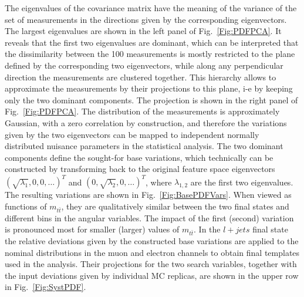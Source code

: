 The eigenvalues of the covariance matrix have the meaning of the variance of the set of measurements in the directions given by the corresponding eigenvectors.
The largest eigenvalues are shown in the left panel of Fig.~\ref{Fig:PDFPCA}.
It reveals that the first two eigenvalues are dominant, which can be interpreted that the dissimilarity between the 100 measurements is mostly restricted to the plane defined by the corresponding two eigenvectors, while along any perpendicular direction the measurements are clustered together.
This hierarchy allows to approximate the measurements by their projections to this plane, i-e by keeping only the two dominant components.
The projection is shown in the right panel of Fig.~\ref{Fig:PDFPCA}.
The distribution of the measurements is approximately Gaussian, with a zero correlation by construction, and therefore the variations given by the two eigenvectors can be mapped to independent normally distributed nuisance parameters in the statistical analysis.
The two dominant components define the sought-for base variations, which technically can be constructed by transforming back to the original feature space eigenvectors $(\sqrt{\lambda_1}, 0, 0, \ldots)^T$ and $(0, \sqrt{\lambda_2}, 0, \ldots)^T$, where $\lambda_{1, 2}$ are the first two eigenvalues.
The resulting variations are shown in Fig.~\ref{Fig:BasePDFVars}.
When viewed as functions of $m_{t\bar t}$, they are qualitatively similar between the two final states and different bins in the angular variables.
The impact of the first (second) variation is pronounced most for smaller (larger) values of $m_{t\bar t}$.
In the $l+jets$ final state the relative deviations given by the constructed base variations are applied to the nominal distributions in the muon and electron channels to obtain final templates used in the analysis.
Their projections for the two search variables, together with the input deviations given by individual MC replicas, are shown in the upper row in Fig.~\ref{Fig:SystPDF}.

